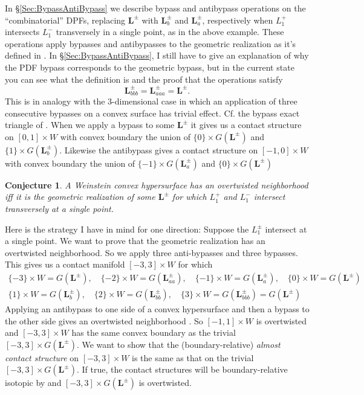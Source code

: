 \documentclass[11pt]{amsart}
\newcommand{\thicc}[1]{\pmb{#1}}
\newcommand{\LagTuple}{\thicc{L}}
\newtheorem{conj}[thm]{Conjecture}
\begin{document}
In \S \ref{Sec:BypassAntiBypass} we describe bypass and antibypass operations on the ``combinatorial'' DPFs, replacing $\LagTuple^{\pm}$ with $\LagTuple^{\pm}_{b}$ and $\LagTuple^{\pm}_{a}$, respectively when $L_{1}^{+}$ intersects $L^{-}_{1}$ transversely in a single point, as in the above example. These operations apply bypasses and antibypasses to the geometric realization as it's defined in \cite{HH:Bypass}. In \S \ref{Sec:BypassAntiBypass}, I still have to give an explanation of why the PDF bypass corresponds to the geometric bypass, but in the current state you can see what the definition is and the proof that the operations satisfy
\begin{equation*}
\LagTuple^{\pm}_{bbb} = \LagTuple^{\pm}_{aaa} = \LagTuple^{\pm}.
\end{equation*}
This is in analogy with the $3$-dimensional case in which an application of three consecutive bypasses on a convex surface has trivial effect. Cf. the bypass exact triangle of \cite[\S 2.3]{HT:Category}. When we apply a bypass to some $\LagTuple^{\pm}$ it gives us a contact structure on $[0, 1] \times W$ with convex boundary the union of $\{ 0 \} \times G(\LagTuple^{\pm})$ and $\{ 1 \} \times G(\LagTuple^{\pm}_{b})$. Likewise the antibypass gives a contact structure on $[-1, 0] \times W$ with convex boundary the union of $\{ -1 \} \times G(\LagTuple^{\pm}_{a})$ and $\{ 0 \} \times G(\LagTuple^{\pm})$

\begin{conj}
A Weinstein convex hypersurface has an overtwisted neighborhood iff it is the geometric realization of some $\LagTuple^{\pm}$ for which $L^{+}_{1}$ and $L^{-}_{1}$ intersect transversely at a single point.
\end{conj}

Here is the strategy I have in mind for one direction: Suppose the $L^{\pm}_{1}$ intersect at a single point. We want to prove that the geometric realization has an overtwisted neighborhood. So we apply three anti-bypasses and three bypasses. This gives us a contact manifold $[-3, 3] \times W$ for which
\begin{equation*}
\begin{gathered}
\{-3\} \times W = G(\LagTuple^{\pm}), \quad \{-2\} \times W = G(\LagTuple^{\pm}_{aa}), \quad \{-1 \} \times W = G(\LagTuple^{\pm}_{a}), \quad \{0\} \times W = G(\LagTuple^{\pm})\\
\{1\} \times W = G(\LagTuple^{\pm}_{b}), \quad \{2 \} \times W = G(\LagTuple^{\pm}_{bb}), \quad \{3\} \times W = G(\LagTuple^{\pm}_{bbb}) = G(\LagTuple^{\pm})
\end{gathered}
\end{equation*}
Applying an antibypass to one side of a convex hypersurface and then a bypass to the other side gives an overtwisted neighborhood \cite[Proposition 6.3.1.]{HH:Bypass}. So $[-1, 1] \times W$ is overtwisted and $[-3, 3] \times W$ has the same convex boundary as the trivial $[-3, 3] \times G(\LagTuple^{\pm})$. We want to show that the (boundary-relative) \emph{almost contact structure} on $[-3, 3] \times W$ is the same as that on the trivial $[-3, 3] \times G(\LagTuple^{\pm})$. If true, the contact structures will be boundary-relative isotopic by \cite{BEM:OT} and $[-3, 3] \times G(\LagTuple^{\pm})$ is overtwisted.
\end{document}
